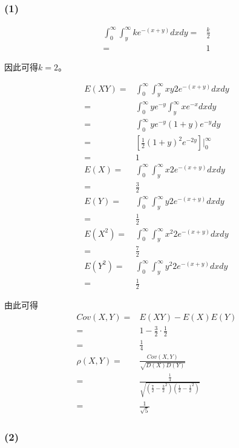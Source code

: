 \documentclass[a4paper,12pt]{ctexart}
\begin{document}
\subsubsection*{(1)}

\begin{align*}
	\int_{0}^{\infty} \int_{y}^{\infty} ke^{-(x+y)} dx dy =& \frac{k}{2} \\
	=& 1
\end{align*}

因此可得$k = 2$。

\begin{align*}
	E(XY) =& \int_{0}^{\infty} \int_{y}^{\infty} xy 2e^{-(x+y)} dx dy \\
	=&\int_{0}^{\infty} y e^{-y} \int_{y}^{\infty} x e^{-x}  dx dy \\
	=&\int_{0}^{\infty} y e^{-y} (1+y) e^{-y} dy \\
	=&\left[\frac{1}{2}(1+y)^2e^{-2y}\right] \bigg|_{0}^{\infty} \\
	=& 1 \\
	E(X) =& \int_{0}^{\infty} \int_{y}^{\infty} x 2e^{-(x+y)} dx dy \\
	=& \frac{3}{2} \\
	E(Y) =& \int_{0}^{\infty} \int_{y}^{\infty} y 2e^{-(x+y)} dx dy \\
	=& \frac{1}{2} \\
	E(X^2) =& \int_{0}^{\infty} \int_{y}^{\infty} x^2 2e^{-(x+y)} dx dy \\
	=& \frac{7}{2} \\
	E(Y^2) =& \int_{0}^{\infty} \int_{y}^{\infty} y^2 2e^{-(x+y)} dx dy \\
	=& \frac{1}{2} 
\end{align*}

由此可得
\begin{align*}
	Cov(X,Y) =& E(XY) - E(X)E(Y) \\
	=& 1 - \frac{3}{2} \cdot \frac{1}{2} \\
	=& \frac{1}{4} \\
	\rho(X,Y) =& \frac{Cov(X,Y)}{\sqrt{D(X)D(Y)}} \\
	=& \frac{\frac{1}{4}}{\sqrt{(\frac{7}{2} - \frac{3}{2}^2)(\frac{1}{2} - \frac{1}{2}^2)}} \\
	=& \frac{1}{\sqrt{5}}
\end{align*}

\subsubsection*{(2)}
\end{document}
